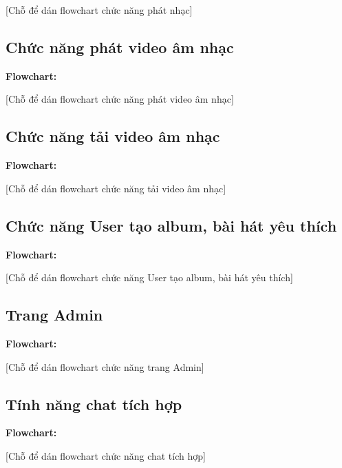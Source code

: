 [Chỗ để dán flowchart chức năng phát nhạc]

\subsection{Chức năng phát video âm nhạc}
\label{subsec:play_video}
\textbf{Flowchart:}

[Chỗ để dán flowchart chức năng phát video âm nhạc]

\subsection{Chức năng tải video âm nhạc}
\label{subsec:download_video}
\textbf{Flowchart:}

[Chỗ để dán flowchart chức năng tải video âm nhạc]

\subsection{Chức năng User tạo album, bài hát yêu thích}
\label{subsec:user_library}
\textbf{Flowchart:}

[Chỗ để dán flowchart chức năng User tạo album, bài hát yêu thích]

\subsection{Trang Admin}
\label{subsec:admin_page}
\textbf{Flowchart:}

[Chỗ để dán flowchart chức năng trang Admin]

\subsection{Tính năng chat tích hợp}
\label{subsec:chat_feature}
\textbf{Flowchart:}

[Chỗ để dán flowchart chức năng chat tích hợp]
